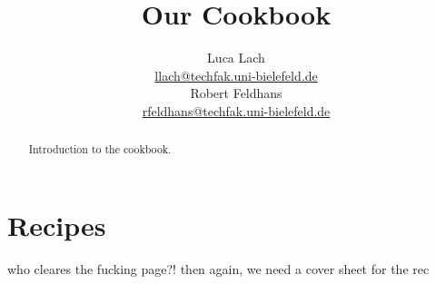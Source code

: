 \documentclass[%
a4paper,
11pt
]{article}
\begin{document}
	
	\title{Our Cookbook}
	\author{Luca Lach\\ 
		\href{mailto:llach@techfak.uni-bielefeld.de}{llach@techfak.uni-bielefeld.de}\\
		Robert Feldhans\\ 
		\href{mailto:rfeldhans@techfak.uni-bielefeld.de}{rfeldhans@techfak.uni-bielefeld.de}}
	\maketitle
	
	\begin{abstract}
		Introduction to the cookbook.
	\end{abstract}
	
	
	\tableofcontents
	
	
	
	\section{Recipes}
	who cleares the fucking page?! then again, we need a cover sheet for the rec
	
	
	
	
\end{document}
